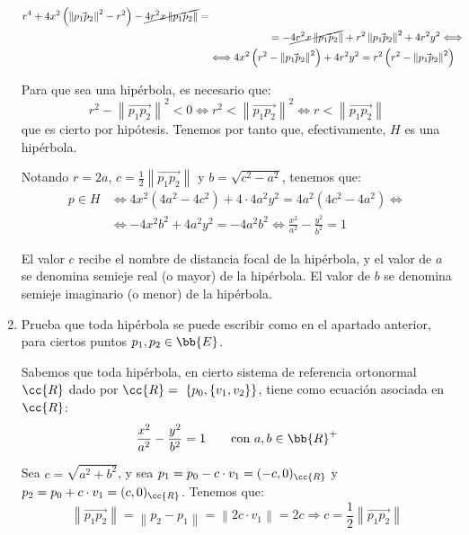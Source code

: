 \begin{ejercicio}
\begin{enumerate}
\begin{align*}
        r^4 + 4x^2\left(\left\|\vec{p_1p_2}\right\|^2-r^2\right) -\cancel{4r^2x\left\|\vec{p_1p_2}\right\|} =\\&\hspace{2cm}= - \cancel{4r^2x\left\|\vec{p_1p_2}\right\|} +r^2\left\|\vec{p_1p_2}\right\|^2 + 4r^2y^2 \Longleftrightarrow \\ & \Longleftrightarrow
        4x^2\left(r^2 - \left\|\vec{p_1p_2}\right\|^2\right) + 4r^2y^2 = r^2\left(r^2 - \left\|\vec{p_1p_2}\right\|^2\right)
    \end{align*}
    
    Para que sea una hipérbola, es necesario que:
    \begin{equation*}
        r^2 - \left\|\vec{p_1p_2}\right\|^2 < 0 \Longleftrightarrow
        r^2 < \left\|\vec{p_1p_2}\right\|^2 \Longleftrightarrow
        r < \left\|\vec{p_1p_2}\right\|
    \end{equation*}
    que es cierto por hipótesis. Tenemos por tanto que, efectivamente, $H$ es una hipérbola.

    Notando $r=2a$, $c=\frac{1}{2}\left\|\vec{p_1p_2}\right\|$ y $b=\sqrt{c^2-a^2}$, tenemos que:
    \begin{align*}
        p\in H &\Longleftrightarrow 4x^2\left(4a^2 - 4c^2\right) + 4\cdot 4a^2y^2 = 4a^2(4c^2 - 4a^2) \Longleftrightarrow \\ & \Longleftrightarrow
        -4x^2b^2 + 4a^2y^2 = -4a^2b^2 \Longleftrightarrow
        \frac{x^2}{a^2} - \frac{y^2}{b^2} = 1
    \end{align*}

    El valor $c$ recibe el nombre de distancia focal de la hipérbola, y el valor de $a$ se denomina semieje real (o mayor) de la hipérbola.
    El valor de $b$ se denomina semieje imaginario (o menor) de la hipérbola.

    \item Prueba que toda hipérbola se puede escribir como en el apartado anterior, para ciertos puntos $p_1, p_2 \in \bb{E}$.
    
    Sabemos que toda hipérbola, en cierto sistema de referencia ortonormal $\cc{R}$ dado por $\cc{R}=~\{p_0, \{v_1, v_2\}\}$, tiene como ecuación asociada en $\cc{R}$:
    \begin{equation*}
        \frac{x^2}{a^2} - \frac{y^2}{b^2} = 1 \qquad \text{con } a,b\in \bb{R}^+
    \end{equation*}

    Sea $c=\sqrt{a^2+b^2}$, y sea $p_1 = p_0 - c\cdot v_1=(-c,0)_{\cc{R}}$ y $p_2 = p_0  +c\cdot v_1=(c,0)_{\cc{R}}$. Tenemos que:
    \begin{equation*}
        \left\|\vec{p_1p_2}\right\| = \left\|p_2 - p_1\right\| = \left\|2c\cdot v_1\right\|= 2c \Longrightarrow c = \frac{1}{2}\left\|\vec{p_1p_2}\right\|
    \end{equation*}


\end{enumerate}
\end{ejercicio}
